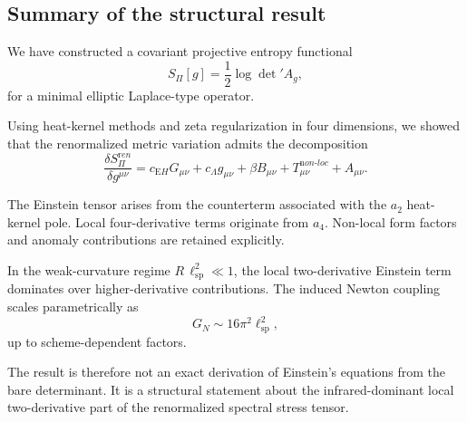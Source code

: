 \subsection{Summary of the structural result}
  \label{subsec:summary}

  We have constructed a covariant projective entropy functional
  \begin{equation}
    S_\Pi[g] = \frac12 \log \det\nolimits' A_g ,
  \end{equation}
  for a minimal elliptic Laplace-type operator.

  Using heat-kernel methods and zeta regularization in four dimensions,
  we showed that the renormalized metric variation admits the decomposition
  \begin{equation}
    \frac{\delta S_\Pi^{\mathrm ren}}{\delta g^{\mu\nu}}
    =
    c_{\mathrm EH} G_{\mu\nu}
    +
    c_\Lambda g_{\mu\nu}
    +
    \beta B_{\mu\nu}
    +
    T^{\mathrm non\mbox{-}loc}_{\mu\nu}
    +
    A_{\mu\nu}.
  \end{equation}

  The Einstein tensor arises from the counterterm associated with the
  $a_2$ heat-kernel pole.
  Local four-derivative terms originate from $a_4$.
  Non-local form factors and anomaly contributions are retained explicitly.

  In the weak-curvature regime $R\,\ell_{\mathrm{sp}}^2 \ll 1$,
  the local two-derivative Einstein term dominates over
  higher-derivative contributions.
  The induced Newton coupling scales parametrically as
  \begin{equation}
    G_N \sim 16\pi^2 \ell_{\mathrm{sp}}^2,
  \end{equation}
  up to scheme-dependent factors.

  The result is therefore not an exact derivation of Einstein's equations
  from the bare determinant.
  It is a structural statement about the infrared-dominant local
  two-derivative part of the renormalized spectral stress tensor.
